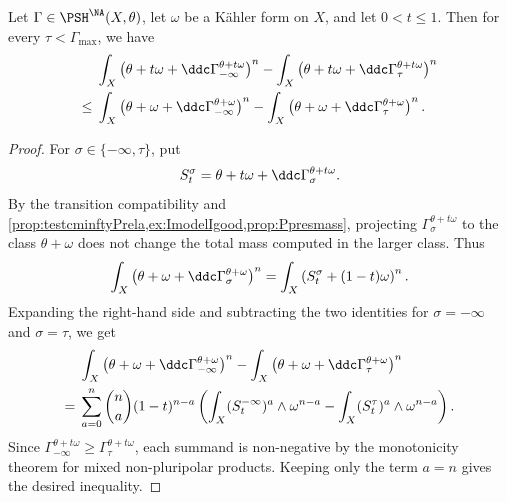 \begin{lemma}\label{lma:NA_mass_drop_transition}
    Let $\Gamma\in \PSH^{\NA}(X,\theta)$, let $\omega$ be a Kähler form on $X$, and let $0<t\leq 1$. Then for every $\tau<\Gamma_{\max}$, we have
    \[
    \begin{aligned}
    &\int_X \left(\theta+t\omega+\ddc\Gamma^{\theta+t\omega}_{-\infty}\right)^n-\int_X \left(\theta+t\omega+\ddc\Gamma^{\theta+t\omega}_{\tau}\right)^n\\
    \leq{}&\int_X \left(\theta+\omega+\ddc\Gamma^{\theta+\omega}_{-\infty}\right)^n-\int_X \left(\theta+\omega+\ddc\Gamma^{\theta+\omega}_{\tau}\right)^n.
    \end{aligned}
    \]
\end{lemma}
\begin{proof}
    For $\sigma\in\{-\infty,\tau\}$, put
    \[
        S_t^\sigma=\theta+t\omega+\ddc\Gamma^{\theta+t\omega}_{\sigma}.
    \]
    By the transition compatibility and \cref{prop:testcminftyPrela,ex:ImodelIgood,prop:Ppresmass}, projecting $\Gamma^{\theta+t\omega}_{\sigma}$ to the class $\theta+\omega$ does not change the total mass computed in the larger class. Thus
    \[
    \int_X \left(\theta+\omega+\ddc\Gamma^{\theta+\omega}_{\sigma}\right)^n
    =
    \int_X \left(S_t^\sigma+(1-t)\omega\right)^n.
    \]
    Expanding the right-hand side and subtracting the two identities for $\sigma=-\infty$ and $\sigma=\tau$, we get
    \[
    \begin{aligned}
    &\int_X \left(\theta+\omega+\ddc\Gamma^{\theta+\omega}_{-\infty}\right)^n-\int_X \left(\theta+\omega+\ddc\Gamma^{\theta+\omega}_{\tau}\right)^n\\
    ={}&\sum_{a=0}^n \binom{n}{a}(1-t)^{n-a}
    \left(\int_X (S_t^{-\infty})^a\wedge\omega^{n-a}-\int_X (S_t^\tau)^a\wedge\omega^{n-a}\right).
    \end{aligned}
    \]
    Since $\Gamma^{\theta+t\omega}_{-\infty}\geq \Gamma^{\theta+t\omega}_{\tau}$, each summand is non-negative by the monotonicity theorem for mixed non-pluripolar products. Keeping only the term $a=n$ gives the desired inequality.
\end{proof}

